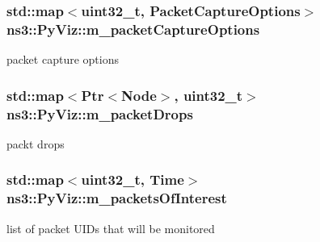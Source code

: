 \subsubsection[{\texorpdfstring{m\+\_\+packet\+Capture\+Options}{m_packetCaptureOptions}}]{\setlength{\rightskip}{0pt plus 5cm}std\+::map$<$uint32\+\_\+t, {\bf Packet\+Capture\+Options}$>$ ns3\+::\+Py\+Viz\+::m\+\_\+packet\+Capture\+Options\hspace{0.3cm}{\ttfamily [private]}}\hypertarget{classns3_1_1PyViz_a4649d891bf333dda1c272ca316224937}{}\label{classns3_1_1PyViz_a4649d891bf333dda1c272ca316224937}


packet capture options 

\subsubsection[{\texorpdfstring{m\+\_\+packet\+Drops}{m_packetDrops}}]{\setlength{\rightskip}{0pt plus 5cm}std\+::map$<${\bf Ptr}$<${\bf Node}$>$, uint32\+\_\+t$>$ ns3\+::\+Py\+Viz\+::m\+\_\+packet\+Drops\hspace{0.3cm}{\ttfamily [private]}}\hypertarget{classns3_1_1PyViz_ae1e7568a80ebd9e74e2a5b6eb6c5c3c1}{}\label{classns3_1_1PyViz_ae1e7568a80ebd9e74e2a5b6eb6c5c3c1}


packt drops 

\subsubsection[{\texorpdfstring{m\+\_\+packets\+Of\+Interest}{m_packetsOfInterest}}]{\setlength{\rightskip}{0pt plus 5cm}std\+::map$<$uint32\+\_\+t, {\bf Time}$>$ ns3\+::\+Py\+Viz\+::m\+\_\+packets\+Of\+Interest\hspace{0.3cm}{\ttfamily [private]}}\hypertarget{classns3_1_1PyViz_af922cc7db7145889b2e518e568eac467}{}\label{classns3_1_1PyViz_af922cc7db7145889b2e518e568eac467}


list of packet U\+I\+Ds that will be monitored 

